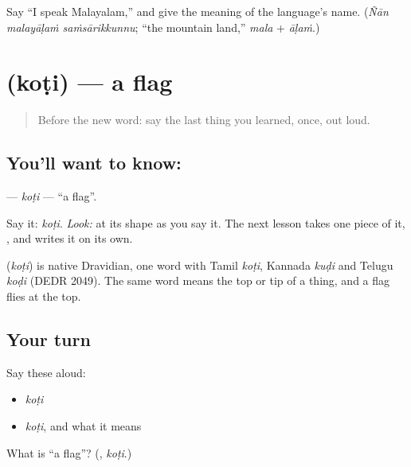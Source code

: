 \begin{tcolorbox}[breakable,colback=teal!4,colframe=teal!35!black,title={Before you move on}]
Say \textquotedblleft{}I speak Malayalam,\textquotedblright{} and give the meaning of the language's name. (\emph{Ñān malayāḷaṁ saṁsārikkunnu}; \textquotedblleft{}the mountain land,\textquotedblright{} \emph{mala} + \emph{āḷaṁ}.)
\end{tcolorbox}
\section[\texorpdfstring{\ml{കൊടി} (koṭi)}{കൊടി (koṭi)}]{ (koṭi) — a flag}

\label{lesson:ML-C05-kodi}



\begin{quote}
Before the new word: say the last thing you learned, once, out loud.
\end{quote}

\subsection*{You'll want to know: }
\textbf{} — \emph{koṭi} — \textquotedblleft{}a flag\textquotedblright{}.

Say it: \emph{koṭi}. \emph{Look:} at its shape as you say it. The next lesson takes one piece of it, \textbf{}, and writes it on its own.

\begin{cousinweb}
\textbf{} (\emph{koṭi}) is native Dravidian, one word with Tamil \emph{koṭi}, Kannada \emph{kuḍi} and Telugu \emph{koḍi} (DEDR 2049). The same word means the top or tip of a thing, and a flag flies at the top.
\end{cousinweb}

\subsection*{Your turn}
Say these aloud:

\begin{itemize}
\raggedright
  \item \emph{koṭi}
  \item \emph{koṭi}, and what it means
\end{itemize}

\begin{tcolorbox}[breakable,colback=teal!4,colframe=teal!35!black,title={Before you move on}]
What is \textquotedblleft{}a flag\textquotedblright{}? (\textbf{}, \emph{koṭi}.)
\end{tcolorbox}
